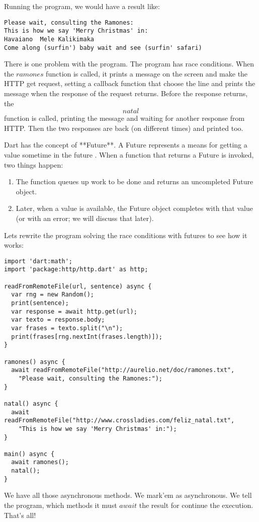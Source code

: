 Running the program, we would have a result like:

\begin{verbatim}
Please wait, consulting the Ramones:
This is how we say 'Merry Christmas' in:
Havaiano  Mele Kalikimaka
Come along (surfin') baby wait and see (surfin' safari)
\end{verbatim}

There is one problem with the program. The program has race conditions. 
When the $ramones$ function is called, it prints a message on the screen and
make the HTTP get request, setting a callback function that choose the line and 
prints the message when the response of the request returns. Before the response 
returns, the $$natal$$ function is called, printing the message and waiting 
for another response from HTTP. Then the two responses are back (on different 
times) and printed too.

Dart has the concept of **Future**. A Future represents a means for getting a
value sometime in the future  \cite{3_14} \cite{3_15} \cite{3_16}.
When a function that returns a Future is invoked, two things happen:

\begin{enumerate}
  \item The function queues up work to be done and returns an uncompleted Future object.
  \item Later, when a value is available, the Future object completes with that value
        (or with an error; we will discuss that later).
\end{enumerate}

Lets rewrite the program solving the race conditions with futures to see how it 
works:

\begin{lstlisting}[label=dart,caption=Dart Async and Future]
import 'dart:math';
import 'package:http/http.dart' as http;

readFromRemoteFile(url, sentence) async {
  var rng = new Random();
  print(sentence);
  var response = await http.get(url);
  var texto = response.body;
  var frases = texto.split("\n");
  print(frases[rng.nextInt(frases.length)]);
}

ramones() async {
  await readFromRemoteFile("http://aurelio.net/doc/ramones.txt",
    "Please wait, consulting the Ramones:");
}

natal() async {
  await readFromRemoteFile("http://www.crossladies.com/feliz_natal.txt",
    "This is how we say 'Merry Christmas' in:");
}

main() async {
  await ramones();
  natal();
}
\end{lstlisting}

We have all those asynchronous methods. We mark'em as asynchronous. We tell the 
program, which methods it must $await$ the result for continue the execution. 
That's all!